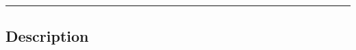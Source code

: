 \documentclass[10pt, A5]{article}
\begin{document}
\begin{framed}
\begin{minipage}{\textwidth}
\begin{multicols}{2}
			\vfill\null

			\end{multicols}

			\vspace{0.25cm}
			\hrule
			\vspace{0.25cm}

			\begin{minipage}{\textwidth}
			\subsection*{\faListAlt \: Description}
			
			\end{minipage}


	\end{minipage}
	\end{framed}

	
\end{document}
